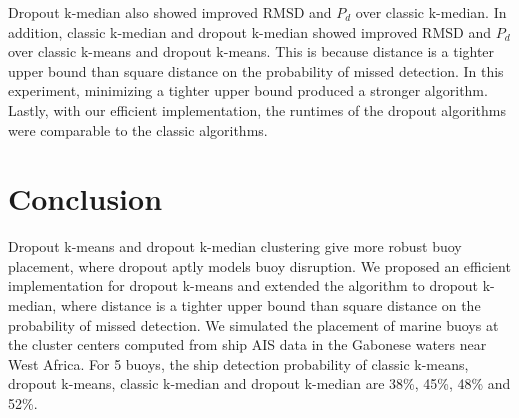 \documentclass{article}
\begin{document}
Dropout k-median also showed improved RMSD and $P_d$ over classic k-median. In addition, classic k-median and dropout k-median showed improved RMSD and $P_d$ over classic k-means and dropout k-means. This is because distance is a tighter upper bound than square distance on the probability of missed detection. In this experiment, minimizing a tighter upper bound produced a stronger algorithm. Lastly, with our efficient implementation, the runtimes of the dropout algorithms were comparable to the classic algorithms.

\section{Conclusion}\label{S:conclusion}

Dropout k-means and dropout k-median clustering give more robust buoy placement, where dropout aptly models buoy disruption. We proposed an efficient implementation for dropout k-means and extended the algorithm to dropout k-median, where distance is a tighter upper bound than square distance on the probability of missed detection. We simulated the placement of marine buoys at the cluster centers computed from ship AIS data in the Gabonese waters near West Africa. For 5 buoys, the ship detection probability of classic k-means, dropout k-means, classic k-median and dropout k-median are 38\%, 45\%, 48\% and 52\%.

\newlength{\bibitemsep}\setlength{\bibitemsep}{.2\baselineskip plus .05\baselineskip minus .05\baselineskip}
\newlength{\bibparskip}\setlength{\bibparskip}{0pt}
\let\oldthebibliography\thebibliography
\renewcommand\thebibliography[1]{%
  \oldthebibliography{#1}%
  \setlength{\parskip}{\bibitemsep}%
  \setlength{\itemsep}{\bibparskip}%
}


\small{}
\end{document}
